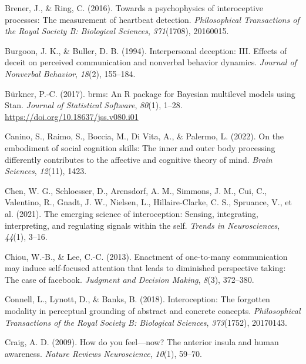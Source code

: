 \documentclass[
  man,mask,floatsintext]{apa6}
\newlength{\cslhangindent}
\newlength{\cslentryspacingunit} %
\newenvironment{CSLReferences}[2] %
 {%
  \setlength{\parindent}{0pt}
  \ifodd #1
  \let\oldpar\par
  \def\par{\hangindent=\cslhangindent\oldpar}
  \fi
  \setlength{\parskip}{#2\cslentryspacingunit}
 }%
 {}
\begin{document}
\begin{CSLReferences}{1}{0}
\leavevmode{}%
Brener, J., \& Ring, C. (2016). Towards a psychophysics of interoceptive processes: The measurement of heartbeat detection. \emph{Philosophical Transactions of the Royal Society B: Biological Sciences}, \emph{371}(1708), 20160015.

\leavevmode{}%
Burgoon, J. K., \& Buller, D. B. (1994). Interpersonal deception: III. Effects of deceit on perceived communication and nonverbal behavior dynamics. \emph{Journal of Nonverbal Behavior}, \emph{18}(2), 155--184.

\leavevmode{}%
Bürkner, P.-C. (2017). {brms}: An {R} package for {Bayesian} multilevel models using {Stan}. \emph{Journal of Statistical Software}, \emph{80}(1), 1--28. \url{https://doi.org/10.18637/jss.v080.i01}

\leavevmode{}%
Canino, S., Raimo, S., Boccia, M., Di Vita, A., \& Palermo, L. (2022). On the embodiment of social cognition skills: The inner and outer body processing differently contributes to the affective and cognitive theory of mind. \emph{Brain Sciences}, \emph{12}(11), 1423.

\leavevmode{}%
Chen, W. G., Schloesser, D., Arensdorf, A. M., Simmons, J. M., Cui, C., Valentino, R., Gnadt, J. W., Nielsen, L., Hillaire-Clarke, C. S., Spruance, V., et al. (2021). The emerging science of interoception: Sensing, integrating, interpreting, and regulating signals within the self. \emph{Trends in Neurosciences}, \emph{44}(1), 3--16.

\leavevmode{}%
Chiou, W.-B., \& Lee, C.-C. (2013). Enactment of one-to-many communication may induce self-focused attention that leads to diminished perspective taking: The case of facebook. \emph{Judgment and Decision Making}, \emph{8}(3), 372--380.

\leavevmode{}%
Connell, L., Lynott, D., \& Banks, B. (2018). Interoception: The forgotten modality in perceptual grounding of abstract and concrete concepts. \emph{Philosophical Transactions of the Royal Society B: Biological Sciences}, \emph{373}(1752), 20170143.

\leavevmode{}%
Craig, A. D. (2009). How do you feel---now? The anterior insula and human awareness. \emph{Nature Reviews Neuroscience}, \emph{10}(1), 59--70.


\end{CSLReferences}
\end{document}

